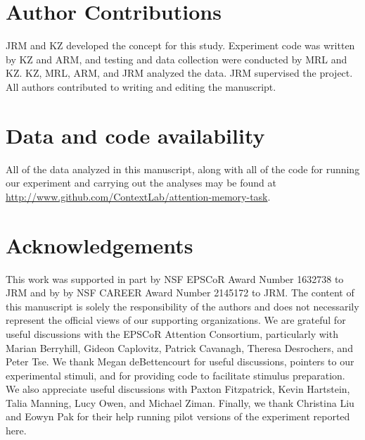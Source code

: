 \documentclass[english]{article}
\begin{document}
\section*{Author Contributions}

JRM and KZ developed the concept for this study. Experiment code was written by
KZ and ARM, and testing and data collection were conducted by MRL and KZ. KZ,
MRL, ARM, and JRM analyzed the data. JRM supervised the project. All authors
contributed to writing and editing the manuscript.

\section*{Data and code availability}

All of the data analyzed in this manuscript, along with all of the code for
running our experiment and carrying out the analyses may be found at
\url{http://www.github.com/ContextLab/attention-memory-task}.


\section*{Acknowledgements}

This work was supported in part by NSF EPSCoR Award Number 1632738 to JRM and
by by NSF CAREER Award Number 2145172 to JRM. The content of this manuscript is
solely the responsibility of the authors and does not necessarily represent the
official views of our supporting organizations. We are grateful for useful
discussions with the EPSCoR Attention Consortium, particularly with Marian
Berryhill, Gideon Caplovitz, Patrick Cavanagh, Theresa Desrochers, and Peter
Tse. We thank Megan deBettencourt for useful discussions, pointers to our
experimental stimuli, and for providing code to facilitate stimulus
preparation. We also appreciate useful discussions with Paxton Fitzpatrick,
Kevin Hartstein, Talia Manning, Lucy Owen, and Michael Ziman. Finally, we thank
Christina Liu and Eowyn Pak for their help running pilot versions of the
experiment reported here.




\end{document}
